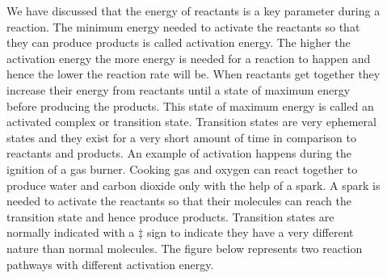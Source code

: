 \documentclass[main.tex]{subfiles}
\newcommand\chapterlabel{kinetics}
\begin{document}
\begin{description}
\item[] 
We have discussed that the energy of reactants is a key parameter during a reaction. The minimum energy needed to activate the reactants so that they can produce products is called activation energy. The higher the activation energy the more energy is needed for a reaction to happen and hence the lower the reaction rate will be. When reactants get together they increase their energy from reactants until a state of maximum energy before producing the products. This state of maximum energy is called an activated complex or transition state. Transition states are very ephemeral states and they exist for a very short amount of time in comparison to reactants and products. An example of activation happens during the ignition of a gas burner. Cooking gas and oxygen can react together to produce water and carbon dioxide only with the help of a spark. A spark is needed to activate the reactants so that their molecules can reach the transition state and hence produce products. Transition states are normally indicated with a $\ddag$  sign to indicate they have a very different nature than normal molecules. The figure below represents two reaction pathways with different activation energy.
\begin{minipage}[b]{1.0\linewidth}
\end{minipage}
\end{description}
\end{document}
